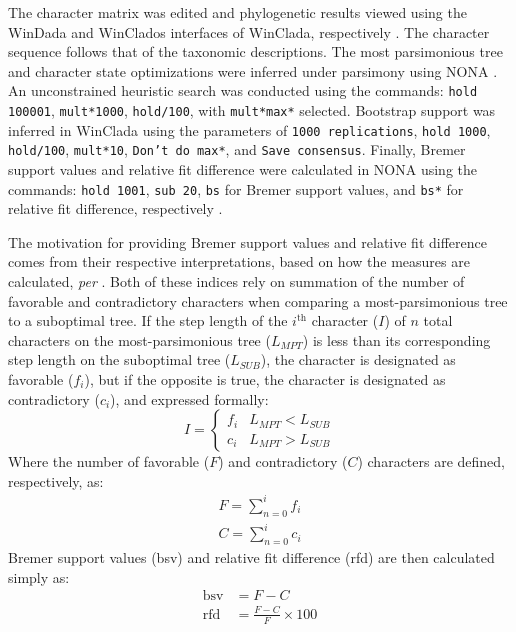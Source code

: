 \documentclass[fleqn,10pt,lineno]{wlpeerj} %
\begin{document}
		The character matrix was edited and phylogenetic results viewed using the WinDada and WinClados interfaces of WinClada, respectively \citep{nixon2002}.
		The character sequence follows that of the taxonomic descriptions.
		The most parsimonious tree and character state optimizations were inferred under parsimony using NONA \citep{goloboff1999}.
		An unconstrained heuristic search was conducted using the commands: \texttt{hold 100001}, \texttt{mult*1000}, \texttt{hold/100}, with \texttt{mult*max*} selected.
		Bootstrap support was inferred in WinClada using the parameters of \texttt{1000 replications}, \texttt{hold 1000}, \texttt{hold/100}, \texttt{mult*10}, \texttt{Don’t do max*}, and \texttt{Save consensus}.
		Finally, Bremer support values \citep{bremer1994} and relative fit difference \citep{goloboff2001} were calculated in NONA using the commands: \texttt{hold 1001}, \texttt{sub 20}, \texttt{bs} for Bremer support values, and \texttt{bs*} for relative fit difference, respectively \citep{goloboff2008}.
		
		The motivation for providing Bremer support values and relative fit difference comes from their respective interpretations, based on how the measures are calculated, \textit{per} \citet{goloboff2001}.
		Both of these indices rely on summation of the number of favorable and contradictory characters when comparing a most-parsimonious tree to a suboptimal tree. 
		If the step length of the $i^{\text{th}}$ character ($I$) of $n$ total characters on the most-parsimonious tree ($L_{MPT}$) is less than its corresponding step length on the suboptimal tree ($L_{SUB}$), the character is designated as favorable ($f_{i}$), but if the opposite is true, the character is designated as contradictory ($c_{i}$), and expressed formally:
		\begin{equation}
		I = 
			\begin{cases}
				f_{i} & L_{MPT} < L_{SUB}\\
				c_{i} & L_{MPT} > L_{SUB}
			\end{cases}
		\end{equation}
		Where the number of favorable ($F$) and contradictory ($C$) characters are defined, respectively, as:
		\begin{align}
			F = \sum_{n = 0}^{i}{f_{i}}\\
			C = \sum_{n = 0}^{i}{c_{i}}
		\end{align}
		Bremer support values (bsv) and relative fit difference (rfd) are then calculated simply as:
		\begin{align}
			\text{bsv} & = F - C\\
			\text{rfd} & = \frac{F - C}{F} \times 100
		\end{align}
		
\end{document}
